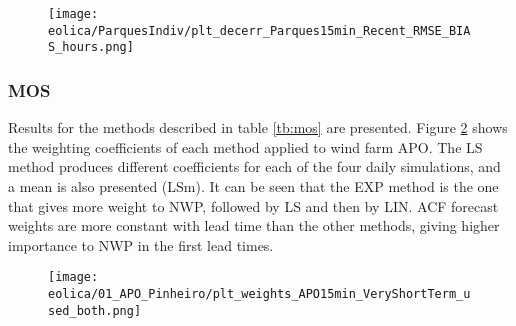\begin{figure}[!htp]
    \centering
    \texttt{[image: eolica/ParquesIndiv/plt\_decerr\_Parques15min\_Recent\_RMSE\_BIAS\_hours.png]}
  \label{fig:parques_RMSE_BIAS_eRecent_hours}
\end{figure}
\FloatBarrier

%

\FloatBarrier
\subsubsection{MOS}

Results for the methods described in table \ref{tb:mos} are presented. Figure \ref{fig:st_weights} shows the weighting coefficients of each method applied to wind farm APO. The LS method produces different coefficients for each of the four daily simulations, and a mean is also presented (LSm). It can be seen that the EXP method is the one that gives more weight to NWP, followed by LS and then by LIN. ACF forecast weights are more constant with lead time than the other methods, giving higher importance to NWP in the first lead times.

\begin{figure}[!htp]
    \centering
    \texttt{[image: eolica/01\_APO\_Pinheiro/plt\_weights\_APO15min\_VeryShortTerm\_used\_both.png]}
    \label{fig:st_weights}
\end{figure}
\FloatBarrier

